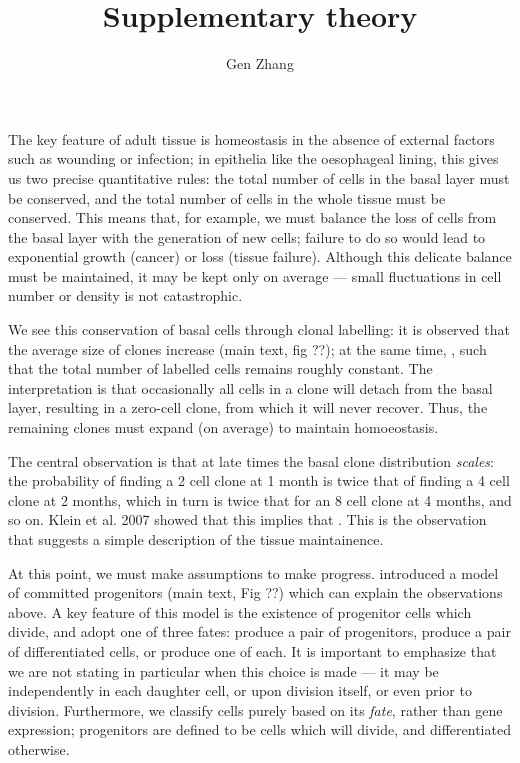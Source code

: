 \documentclass[10pt,UKenglish]{article}
\begin{document}
\title{Supplementary theory}
\author{Gen Zhang}
\date{}
 
\maketitle

\renewcommand{\thesection}{S-\Roman{section}}

The key feature of adult tissue is homeostasis in the absence of external
factors such as wounding or infection; in epithelia like the oesophageal lining,
this gives us two precise quantitative rules: the total number of cells in the
basal layer must be conserved, and the total number of cells in the whole tissue
must be conserved. This means that, for example, we must balance the loss of
cells from the basal layer with the generation of new cells; failure to do so
would lead to exponential growth (cancer) or loss (tissue failure). Although
this delicate balance must be maintained, it may be kept only on average ---
small fluctuations in cell number or density is not catastrophic.

We see this conservation of basal cells through clonal labelling: it is observed
that the average size of clones increase (main text, fig ??); at the same time,
, such that the total number of labelled cells remains roughly
constant. The interpretation is that occasionally all cells in a clone will
detach from the basal layer, resulting in a zero-cell clone, from which it will
never recover. Thus, the remaining clones must expand (on average) to maintain
homoeostasis.

The central observation is that at late times the basal clone distribution
\emph{scales}: the probability of finding a 2 cell clone at 1 month is twice
that of finding a 4 cell clone at 2 months, which in turn is twice that for an 8
cell clone at 4 months, and so on. Klein et al. 2007 showed that this implies
that . This is the
observation that suggests a simple description of the tissue maintainence.

At this point, we must make assumptions to make progress.  introduced a model of committed
progenitors (main text, Fig ??) which can explain the observations above. A key
feature of this model is the existence of progenitor cells which divide, and
adopt one of three fates: produce a pair of progenitors, produce a pair of
differentiated cells, or produce one of each. It is important to emphasize that
we are not stating in particular when this choice is made --- it may be
independently in each daughter cell, or upon division itself, or even prior to
division. Furthermore, we classify cells purely based on its \emph{fate}, rather
than gene expression; progenitors are defined to be cells which will divide, and
differentiated otherwise. 
\end{document}
